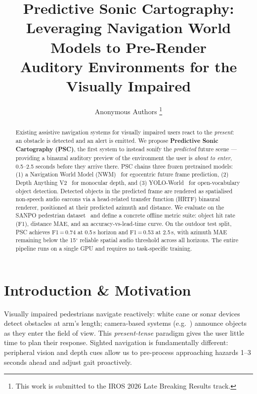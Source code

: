 \documentclass[letterpaper, 10pt, conference]{ieeeconf}
\title{\LARGE \bf Predictive Sonic Cartography:\\
Leveraging Navigation World Models to Pre-Render\\
Auditory Environments for the Visually Impaired}
\author{Anonymous Authors%
\thanks{This work is submitted to the IROS 2026 Late Breaking Results track.}}
\begin{document}
\maketitle
\thispagestyle{empty}
\pagestyle{empty}

\begin{abstract}
Existing assistive navigation systems for visually impaired users react
to the \textit{present}: an obstacle is detected and an alert is emitted.
We propose \textbf{Predictive Sonic Cartography (PSC)}, the first system
to instead sonify the \textit{predicted} future scene — providing a
binaural auditory preview of the environment the user is \emph{about to
enter}, 0.5–2.5 seconds before they arrive there.
PSC chains three frozen pretrained models: (1) a Navigation World Model
(NWM)~\cite{bar2025nwm} for ego\-centric future frame prediction,
(2) Depth Anything V2~\cite{yang2024depth} for monocular depth, and
(3) YOLO-World~\cite{cheng2024yolo} for open-vocabulary object detection.
Detected objects in the predicted frame are rendered as spatialised
non-speech audio earcons via a head-related transfer function (HRTF)
binaural renderer, positioned at their predicted azimuth and distance.
We evaluate on the SANPO pedestrian dataset~\cite{sanpo2025} and define
a concrete offline metric suite: object hit rate (F1), distance MAE, and
an accuracy-vs-lead-time curve. On the outdoor test split,
PSC achieves F1\,=\,0.74 at 0.5\,s horizon and F1\,=\,0.53 at 2.5\,s,
with azimuth MAE remaining below the 15$^\circ$ reliable spatial audio
threshold across all horizons. The entire pipeline runs on a single GPU
and requires no task-specific training.
\end{abstract}

\section{Introduction \& Motivation}

Visually impaired pedestrians navigate reactively: white cane or sonar
devices detect obstacles at arm's length; camera-based systems
(e.g.~\cite{glassestech}) announce objects as they enter the field of
view.  This \emph{present-tense} paradigm gives the user little time to
plan their response.  Sighted navigation is fundamentally different:
peripheral vision and depth cues allow us to pre-process approaching
hazards 1–3 seconds ahead and adjust gait proactively.
\end{document}
